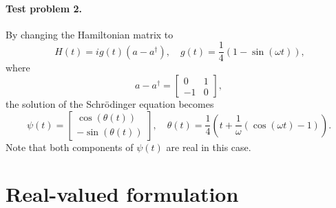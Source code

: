 \documentclass[11pt]{article}
\begin{document}
\paragraph{Test problem 2.}
By changing the Hamiltonian matrix to
\begin{equation}\
H(t) = i g(t) (a - a^\dag),\quad g(t) = \frac{1}{4}\left(1 - \sin(\omega t)\right),
\end{equation}
where
\[
a- a^\dag =
\begin{bmatrix}
  0  & 1\\
  -1 & 0
\end{bmatrix},
\]
the solution of the Schr\"odinger equation becomes
\[
\psi(t) = \begin{bmatrix}
  \cos(\theta(t))\\
  -\sin(\theta(t))
  \end{bmatrix},\quad \theta(t) = \frac{1}{4}\left( t + \frac{1}{\omega}(\cos(\omega t) - 1)\right).
\]
Note that both components of $\psi(t)$ are real in this case.

\section{Real-valued formulation}
\end{document}
